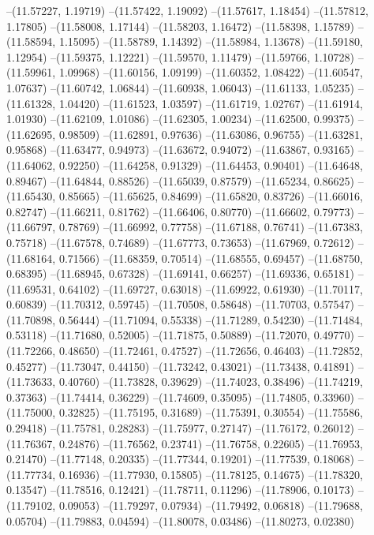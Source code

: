 --(11.57227, 1.19719)
--(11.57422, 1.19092)
--(11.57617, 1.18454)
--(11.57812, 1.17805)
--(11.58008, 1.17144)
--(11.58203, 1.16472)
--(11.58398, 1.15789)
--(11.58594, 1.15095)
--(11.58789, 1.14392)
--(11.58984, 1.13678)
--(11.59180, 1.12954)
--(11.59375, 1.12221)
--(11.59570, 1.11479)
--(11.59766, 1.10728)
--(11.59961, 1.09968)
--(11.60156, 1.09199)
--(11.60352, 1.08422)
--(11.60547, 1.07637)
--(11.60742, 1.06844)
--(11.60938, 1.06043)
--(11.61133, 1.05235)
--(11.61328, 1.04420)
--(11.61523, 1.03597)
--(11.61719, 1.02767)
--(11.61914, 1.01930)
--(11.62109, 1.01086)
--(11.62305, 1.00234)
--(11.62500, 0.99375)
--(11.62695, 0.98509)
--(11.62891, 0.97636)
--(11.63086, 0.96755)
--(11.63281, 0.95868)
--(11.63477, 0.94973)
--(11.63672, 0.94072)
--(11.63867, 0.93165)
--(11.64062, 0.92250)
--(11.64258, 0.91329)
--(11.64453, 0.90401)
--(11.64648, 0.89467)
--(11.64844, 0.88526)
--(11.65039, 0.87579)
--(11.65234, 0.86625)
--(11.65430, 0.85665)
--(11.65625, 0.84699)
--(11.65820, 0.83726)
--(11.66016, 0.82747)
--(11.66211, 0.81762)
--(11.66406, 0.80770)
--(11.66602, 0.79773)
--(11.66797, 0.78769)
--(11.66992, 0.77758)
--(11.67188, 0.76741)
--(11.67383, 0.75718)
--(11.67578, 0.74689)
--(11.67773, 0.73653)
--(11.67969, 0.72612)
--(11.68164, 0.71566)
--(11.68359, 0.70514)
--(11.68555, 0.69457)
--(11.68750, 0.68395)
--(11.68945, 0.67328)
--(11.69141, 0.66257)
--(11.69336, 0.65181)
--(11.69531, 0.64102)
--(11.69727, 0.63018)
--(11.69922, 0.61930)
--(11.70117, 0.60839)
--(11.70312, 0.59745)
--(11.70508, 0.58648)
--(11.70703, 0.57547)
--(11.70898, 0.56444)
--(11.71094, 0.55338)
--(11.71289, 0.54230)
--(11.71484, 0.53118)
--(11.71680, 0.52005)
--(11.71875, 0.50889)
--(11.72070, 0.49770)
--(11.72266, 0.48650)
--(11.72461, 0.47527)
--(11.72656, 0.46403)
--(11.72852, 0.45277)
--(11.73047, 0.44150)
--(11.73242, 0.43021)
--(11.73438, 0.41891)
--(11.73633, 0.40760)
--(11.73828, 0.39629)
--(11.74023, 0.38496)
--(11.74219, 0.37363)
--(11.74414, 0.36229)
--(11.74609, 0.35095)
--(11.74805, 0.33960)
--(11.75000, 0.32825)
--(11.75195, 0.31689)
--(11.75391, 0.30554)
--(11.75586, 0.29418)
--(11.75781, 0.28283)
--(11.75977, 0.27147)
--(11.76172, 0.26012)
--(11.76367, 0.24876)
--(11.76562, 0.23741)
--(11.76758, 0.22605)
--(11.76953, 0.21470)
--(11.77148, 0.20335)
--(11.77344, 0.19201)
--(11.77539, 0.18068)
--(11.77734, 0.16936)
--(11.77930, 0.15805)
--(11.78125, 0.14675)
--(11.78320, 0.13547)
--(11.78516, 0.12421)
--(11.78711, 0.11296)
--(11.78906, 0.10173)
--(11.79102, 0.09053)
--(11.79297, 0.07934)
--(11.79492, 0.06818)
--(11.79688, 0.05704)
--(11.79883, 0.04594)
--(11.80078, 0.03486)
--(11.80273, 0.02380)
